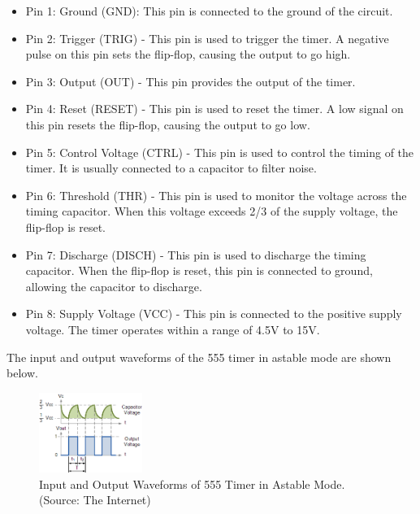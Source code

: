 \documentclass{scrartcl}
\newcommand{\1}{\mathbbm{1}}
\begin{document}
\begin{itemize}
    \item Pin 1: Ground (GND): This pin is connected to the ground of the circuit.
    \item Pin 2: Trigger (TRIG) - This pin is used to trigger the timer. A negative pulse on this pin sets the flip-flop, causing the output to go high.
    \item Pin 3: Output (OUT) - This pin provides the output of the timer. 
    \item Pin 4: Reset (RESET) - This pin is used to reset the timer. A low signal on this pin resets the flip-flop, causing the output to go low.
    \item Pin 5: Control Voltage (CTRL) - This pin is used to control the timing of the timer. It is usually connected to a capacitor to filter noise.
    \item Pin 6: Threshold (THR) - This pin is used to monitor the voltage across the timing capacitor. When this voltage exceeds 2/3 of the supply voltage, the flip-flop is reset.
    \item Pin 7: Discharge (DISCH) - This pin is used to discharge the timing capacitor. When the flip-flop is reset, this pin is connected to ground, allowing the capacitor to discharge.
    \item Pin 8: Supply Voltage (VCC) - This pin is connected to the positive supply voltage. The timer operates within a range of 4.5V to 15V.
\end{itemize} 

The input and output waveforms of the 555 timer in astable mode are shown below. 
\begin{figure}[H]
    \centering
    \includegraphics[width=0.3\textwidth]{waveforms.png}
    \caption{Input and Output Waveforms of 555 Timer in Astable Mode.  (Source: The Internet)}
    \label{fig:waveform}
\end{figure}
\end{document}

